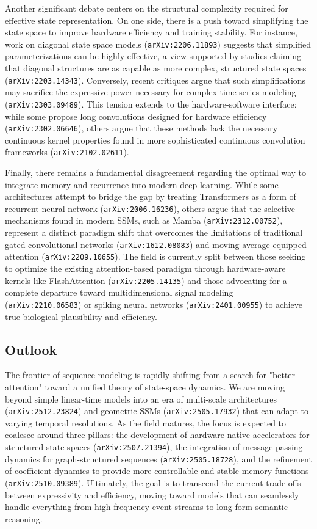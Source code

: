\documentclass[11pt]{article}
\begin{document}
Another significant debate centers on the structural complexity required for effective state representation. On one side, there is a push toward simplifying the state space to improve hardware efficiency and training stability. For instance, work on diagonal state space models (\texttt{arXiv:2206.11893}) suggests that simplified parameterizations can be highly effective, a view supported by studies claiming that diagonal structures are as capable as more complex, structured state spaces (\texttt{arXiv:2203.14343}). Conversely, recent critiques argue that such simplifications may sacrifice the expressive power necessary for complex time-series modeling (\texttt{arXiv:2303.09489}). This tension extends to the hardware-software interface: while some propose long convolutions designed for hardware efficiency (\texttt{arXiv:2302.06646}), others argue that these methods lack the necessary continuous kernel properties found in more sophisticated continuous convolution frameworks (\texttt{arXiv:2102.02611}).

Finally, there remains a fundamental disagreement regarding the optimal way to integrate memory and recurrence into modern deep learning. While some architectures attempt to bridge the gap by treating Transformers as a form of recurrent neural network (\texttt{arXiv:2006.16236}), others argue that the selective mechanisms found in modern SSMs, such as Mamba (\texttt{arXiv:2312.00752}), represent a distinct paradigm shift that overcomes the limitations of traditional gated convolutional networks (\texttt{arXiv:1612.08083}) and moving-average-equipped attention (\texttt{arXiv:2209.10655}). The field is currently split between those seeking to optimize the existing attention-based paradigm through hardware-aware kernels like FlashAttention (\texttt{arXiv:2205.14135}) and those advocating for a complete departure toward multidimensional signal modeling (\texttt{arXiv:2210.06583}) or spiking neural networks (\texttt{arXiv:2401.00955}) to achieve true biological plausibility and efficiency.

\subsection{Outlook}

The frontier of sequence modeling is rapidly shifting from a search for "better attention" toward a unified theory of state-space dynamics. We are moving beyond simple linear-time models into an era of multi-scale architectures (\texttt{arXiv:2512.23824}) and geometric SSMs (\texttt{arXiv:2505.17932}) that can adapt to varying temporal resolutions. As the field matures, the focus is expected to coalesce around three pillars: the development of hardware-native accelerators for structured state spaces (\texttt{arXiv:2507.21394}), the integration of message-passing dynamics for graph-structured sequences (\texttt{arXiv:2505.18728}), and the refinement of coefficient dynamics to provide more controllable and stable memory functions (\texttt{arXiv:2510.09389}). Ultimately, the goal is to transcend the current trade-offs between expressivity and efficiency, moving toward models that can seamlessly handle everything from high-frequency event streams to long-form semantic reasoning.
\end{document}
